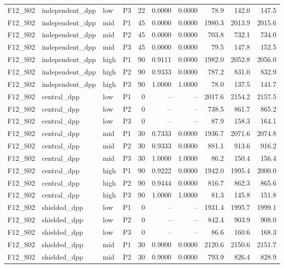 \begin{longtable}{llllrrrrrr}
F12\_S02 & independent\_dpp & low & P3 & 22 & 0.0000 & 0.0000 & 78.9 & 142.0 & 147.5 \\
F12\_S02 & independent\_dpp & mid & P1 & 45 & 0.0000 & 0.0000 & 1980.3 & 2013.9 & 2015.6 \\
F12\_S02 & independent\_dpp & mid & P2 & 45 & 0.0000 & 0.0000 & 703.8 & 732.1 & 734.0 \\
F12\_S02 & independent\_dpp & mid & P3 & 45 & 0.0000 & 0.0000 & 79.5 & 147.8 & 152.5 \\
F12\_S02 & independent\_dpp & high & P1 & 90 & 0.9111 & 0.0000 & 1982.0 & 2052.8 & 2056.0 \\
F12\_S02 & independent\_dpp & high & P2 & 90 & 0.9333 & 0.0000 & 787.2 & 831.0 & 832.9 \\
F12\_S02 & independent\_dpp & high & P3 & 90 & 1.0000 & 1.0000 & 78.0 & 137.5 & 141.7 \\
F12\_S02 & central\_dpp & low & P1 & 0 & -- & -- & 2017.6 & 2154.2 & 2157.5 \\
F12\_S02 & central\_dpp & low & P2 & 0 & -- & -- & 738.5 & 861.7 & 865.2 \\
F12\_S02 & central\_dpp & low & P3 & 0 & -- & -- & 87.9 & 158.3 & 164.1 \\
F12\_S02 & central\_dpp & mid & P1 & 30 & 0.7333 & 0.0000 & 1936.7 & 2071.6 & 2074.8 \\
F12\_S02 & central\_dpp & mid & P2 & 30 & 0.9333 & 0.0000 & 881.1 & 913.6 & 916.2 \\
F12\_S02 & central\_dpp & mid & P3 & 30 & 1.0000 & 1.0000 & 86.2 & 150.4 & 156.4 \\
F12\_S02 & central\_dpp & high & P1 & 90 & 0.9222 & 0.0000 & 1942.0 & 1995.4 & 2000.0 \\
F12\_S02 & central\_dpp & high & P2 & 90 & 0.9444 & 0.0000 & 816.7 & 862.3 & 865.6 \\
F12\_S02 & central\_dpp & high & P3 & 90 & 1.0000 & 1.0000 & 81.3 & 145.8 & 151.8 \\
F12\_S02 & shielded\_dpp & low & P1 & 0 & -- & -- & 1931.4 & 1995.7 & 1999.1 \\
F12\_S02 & shielded\_dpp & low & P2 & 0 & -- & -- & 842.4 & 903.9 & 908.0 \\
F12\_S02 & shielded\_dpp & low & P3 & 0 & -- & -- & 86.6 & 160.6 & 168.3 \\
F12\_S02 & shielded\_dpp & mid & P1 & 30 & 0.9000 & 0.0000 & 2120.6 & 2150.6 & 2151.7 \\
F12\_S02 & shielded\_dpp & mid & P2 & 30 & 0.9000 & 0.0000 & 793.9 & 826.4 & 828.9 \\

\end{longtable}

